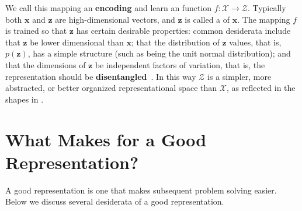 We call this mapping an {\bf encoding} and learn an  function $f: \mathcal{X} \rightarrow \mathcal{Z}$. Typically both $\mathbf{x}$ and $\mathbf{z}$ are high-dimensional vectors, and $\mathbf{z}$ is called a  of $\mathbf{x}$. The mapping $f$ is trained so that $\mathbf{z}$ has certain desirable properties: common desiderata include that $\mathbf{z}$ be lower dimensional than $\mathbf{x}$; that the distribution of $\mathbf{z}$ values, that is, $p(\mathbf{z})$, has a simple structure (such as being the unit normal distribution); and that the dimensions of $\mathbf{z}$ be independent factors of variation, that is, the representation should be \textbf{disentangled}~\cite{bengio2013representation}. In this way $\mathcal{Z}$ is a simpler, more abstracted, or better organized representational space than $\mathcal{X}$, as reflected in the shapes in \fig{\ref{fig:representation_learning:rep_learning_schematic}}.

\section{What Makes for a Good Representation?}

A good representation is one that makes subsequent problem solving easier. Below we discuss several desiderata of a good representation.

